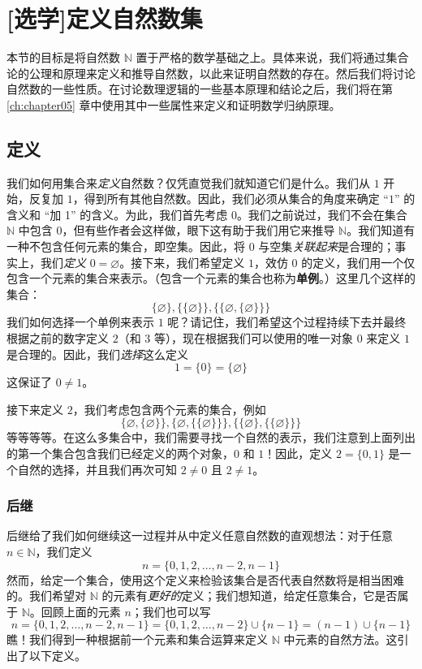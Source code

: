 \section[定义自然数集]{[选学]定义自然数集}\label{sec:section3.8}

本节的目标是将自然数 $\mathbb{N}$ 置于严格的数学基础之上。具体来说，我们将通过集合论的公理和原理来定义和推导自然数，以此来证明自然数的存在。然后我们将讨论自然数的一些性质。在讨论数理逻辑的一些基本原理和结论之后，我们将在第 \ref{ch:chapter05} 章中使用其中一些属性来定义和证明数学归纳原理。

\subsection{定义}

我们如何用集合来\emph{定义}自然数？仅凭直觉我们就知道它们是什么。我们从 $1$ 开始，反复加 $1$，得到所有其他自然数。因此，我们必须从集合的角度来确定 ``$1$'' 的含义和 ``加 1'' 的含义。为此，我们首先考虑 $0$。我们之前说过，我们不会在集合 $\mathbb{N}$ 中包含 $0$，但有些作者会这样做，眼下这有助于我们用它来推导 $\mathbb{N}$。我们知道有一种不包含任何元素的集合，即空集。因此，将 $0$ 与空集\emph{关联起来}是合理的；事实上，我们\emph{定义} $0 = \varnothing$。接下来，我们希望定义 $1$，效仿 $0$ 的定义，我们用一个仅包含一个元素的集合来表示。（包含一个元素的集合也称为\textbf{单例}。）这里几个这样的集合：
\[\{\varnothing\}, \{\{\varnothing\}\} , \{\{\varnothing, \{\varnothing\}\}\}\]
我们如何选择一个单例来表示 $1$ 呢？请记住，我们希望这个过程持续下去并最终根据之前的数字定义 $2$（和 $3$ 等），现在根据我们可以使用的唯一对象 $0$ 来定义 $1$ 是合理的。因此，我们\emph{选择}这么定义
\[1 = \{0\} = \{\varnothing\}\]
这保证了 $0 \ne 1$。

接下来定义 $2$，我们考虑包含两个元素的集合，例如
\[\{\varnothing, \{\varnothing\}\}, \{\varnothing, \{\{\varnothing\}\}\}, \{\{\varnothing\}, \{\{\varnothing\}\}\}\]
等等等等。在这么多集合中，我们需要寻找一个自然的表示，我们注意到上面列出的第一个集合包含我们已经定义的两个对象，$0$ 和 $1$！因此，定义 $2 = \{0, 1\}$ 是一个自然的选择，并且我们再次可知 $2 \ne 0$ 且 $2 \ne 1$。

\subsubsection*{后继}

后继给了我们如何继续这一过程并从中定义任意自然数的直观想法：对于任意 $n \in \mathbb{N}$，我们定义
\[n = \{0, 1, 2, \dots , n - 2, n - 1\}\]
然而，给定一个集合，使用这个定义来检验该集合是否代表自然数将是相当困难的。我们希望对 $\mathbb{N}$ 的元素有\emph{更好的}定义；我们想知道，给定任意集合，它是否属于 $\mathbb{N}$。回顾上面的元素 $n$；我们也可以写
\[n = \{0, 1, 2, \dots , n - 2, n - 1\} = \{0, 1, 2, \dots , n - 2\} \cup \{n-1\} = (n-1) \cup \{n-1\}\]
瞧！我们得到一种根据前一个元素和集合运算来定义 $\mathbb{N}$ 中元素的自然方法。这引出了以下定义。

